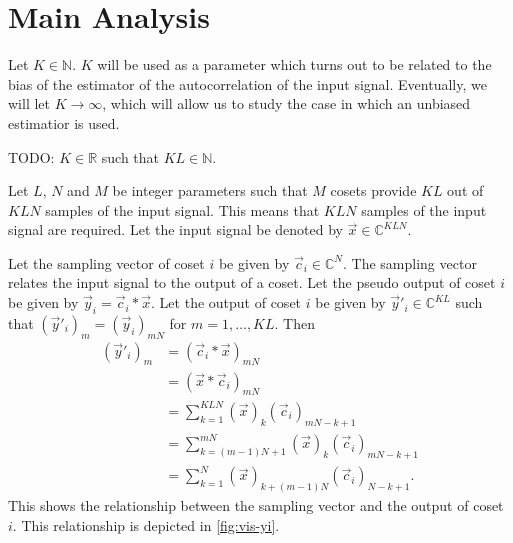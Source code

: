 \documentclass[a4paper, openany, oneside]{memoir}
\begin{document}
\section{Main Analysis}
Let $K \in \mathbb{N}$. $K$ will be used as a parameter which turns out to be related to the bias of the estimator of the autocorrelation of the input signal. Eventually, we will let $K \to \infty$, which will allow us to study the case in which an unbiased estimatior is used.

TODO: $K \in \mathbb{R}$ such that $K L \in \mathbb{N}$.

Let $L$, $N$ and $M$ be integer parameters such that $M$ cosets provide $KL$ out of $KLN$ samples of the input signal. This means that $KLN$ samples of the input signal are required. Let the input signal be denoted by $\vec{x} \in \mathbb{C}^{KLN}$.

Let the sampling vector of coset $i$ be given by $\vec{c}_i \in \mathbb{C}^{N}$. The sampling vector relates the input signal to the output of a coset. Let the pseudo output of coset $i$ be given by $\vec{y}_i = \vec{c}_i \ast \vec{x}$. Let the output of coset $i$ be given by $\vec{y}'_i \in \mathbb{C}^{KL}$ such that $(\vec{y}'_i)_m=(\vec{y}_i)_{mN}$ for $m=1,\ldots,KL$. Then
\begin{align*}
    (\vec{y}'_i)_m &= (\vec{c}_i \ast \vec{x})_{mN} \\
    &= (\vec{x} \ast \vec{c}_i)_{mN} \\
    &= \sum_{k=1}^{KLN} (\vec{x})_k (\vec{c}_i)_{mN-k+1} \\
    &= \sum_{k=(m-1)N+1}^{mN} (\vec{x})_k (\vec{c}_i)_{mN-k+1} \\
    &= \sum_{k=1}^{N} (\vec{x})_{k+(m-1)N} (\vec{c}_i)_{N-k+1}.
\end{align*}
This shows the relationship between the sampling vector and the output of coset $i$. This relationship is depicted in \cref{fig:vis-yi}.
\end{document}
